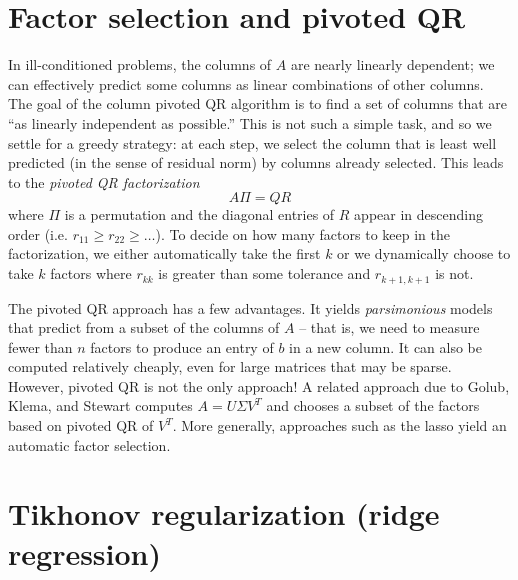 \documentclass[12pt, leqno]{article} %
\begin{document}

\section{Factor selection and pivoted QR}

In ill-conditioned problems, the columns of $A$ are nearly linearly
dependent; we can effectively predict some columns as linear
combinations of other columns.  The goal of the column pivoted QR
algorithm is to find a set of columns that are ``as linearly
independent as possible.''  This is not such a simple task,
and so we settle for a greedy strategy: at each step, we select the
column that is least well predicted (in the sense of residual norm)
by columns already selected.  This leads to the {\em pivoted QR
  factorization}
\[
  A \Pi = Q R
\]
where $\Pi$ is a permutation and the diagonal entries of $R$ appear
in descending order (i.e. $r_{11} \geq r_{22} \geq \ldots$).  To
decide on how many factors to keep in the factorization, we either
automatically take the first $k$ or we dynamically choose to take $k$
factors where $r_{kk}$ is greater than some tolerance and
$r_{k+1,k+1}$ is not.

The pivoted QR approach has a few advantages.  It yields {\em
  parsimonious} models that predict from a subset of the columns of
$A$ -- that is, we need to measure fewer than $n$ factors to produce
an entry of $b$ in a new column.  It can also be computed relatively
cheaply, even for large matrices that may be sparse.
However, pivoted QR is not the only approach!  A related approach
due to Golub, Klema, and Stewart computes $A = U \Sigma V^T$ and
chooses a subset of the factors based on pivoted QR of $V^T$.
More generally, approaches such as the lasso yield an automatic
factor selection.

\section{Tikhonov regularization (ridge regression)}
\end{document}
